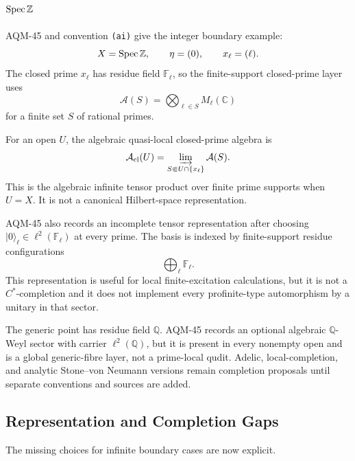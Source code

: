 \subsection{\texorpdfstring{\(\operatorname{Spec}\mathbb Z\)}{Spec Z}}

AQM-45 and convention \texttt{(ai)} give the integer boundary example:
\[
  X=\operatorname{Spec}\mathbb Z,\qquad \eta=(0),\qquad x_\ell=(\ell).
\]
The closed prime \(x_\ell\) has residue field \(\mathbb F_\ell\), so the
finite-support closed-prime layer uses
\[
  \mathcal A(S)=
  \bigotimes_{\ell\in S}M_\ell(\mathbb C)
\]
for a finite set \(S\) of rational primes.

For an open \(U\), the algebraic quasi-local closed-prime algebra is
\[
  \mathcal A_{\rm cl}(U)=
  \varinjlim_{S\Subset U\cap\{x_\ell\}}\mathcal A(S).
\]
This is the algebraic infinite tensor product over finite prime supports when
\(U=X\).  It is not a canonical Hilbert-space representation.

AQM-45 also records an incomplete tensor representation after choosing
\(|0\rangle_\ell\in\ell^2(\mathbb F_\ell)\) at every prime.  The basis is
indexed by finite-support residue configurations
\[
  \bigoplus_\ell \mathbb F_\ell.
\]
This representation is useful for local finite-excitation calculations, but
it is not a \(C^*\)-completion and it does not implement every profinite-type
automorphism by a unitary in that sector.

The generic point has residue field \(\mathbb Q\).  AQM-45 records an optional
algebraic \(\mathbb Q\)-Weyl sector with carrier \(\ell^2(\mathbb Q)\), but it
is present in every nonempty open and is a global generic-fibre layer, not a
prime-local qudit.  Adelic, local-completion, and analytic Stone--von Neumann
versions remain completion proposals until separate conventions and sources
are added.

\subsection{Representation and Completion Gaps}

The missing choices for infinite boundary cases are now explicit.

